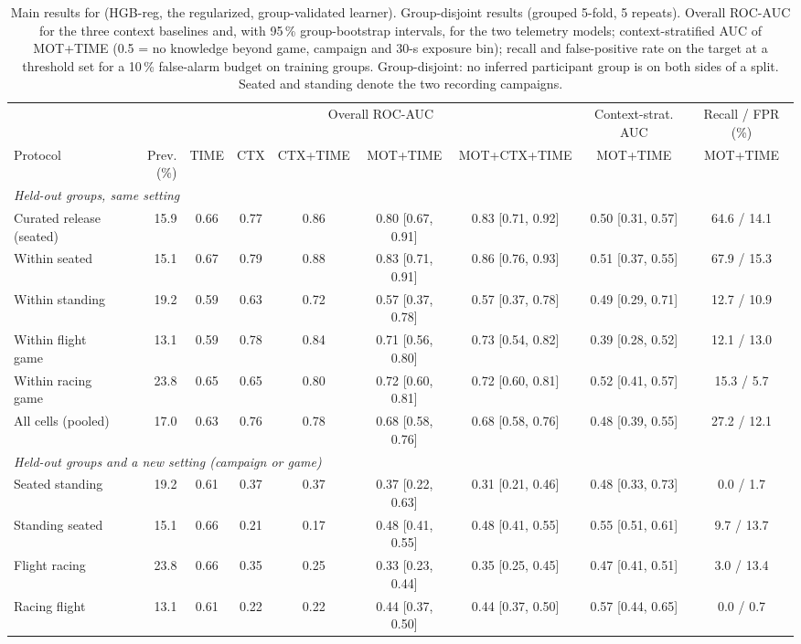 \begin{table}[t]
\centering
\footnotesize
\caption{Main results for \sevtwo{} (HGB-reg, the regularized, group-validated learner). Group-disjoint results (grouped 5-fold, 5 repeats). Overall ROC-AUC for the three context baselines and, with 95\,\% group-bootstrap intervals, for the two telemetry models; context-stratified AUC of MOT+TIME (0.5 = no knowledge beyond game, campaign and 30-s exposure bin); recall and false-positive rate on the target at a threshold set for a 10\,\% false-alarm budget on training groups. Group-disjoint: no inferred participant group is on both sides of a split. Seated and standing denote the two recording campaigns.}
\label{tab:main}
\footnotesize
\setlength{\tabcolsep}{2.4pt}
\begin{tabular}{lrccccccc}
\toprule
 & & \multicolumn{5}{c}{Overall ROC-AUC} & Context-strat. AUC & Recall / FPR (\%) \\
\cmidrule(lr){3-7}\cmidrule(lr){8-8}\cmidrule(lr){9-9}
Protocol & Prev. (\%) & TIME & CTX & CTX+TIME & MOT+TIME & MOT+CTX+TIME & MOT+TIME & MOT+TIME \\
\midrule
\multicolumn{9}{l}{\emph{Held-out groups, same setting}} \\
Curated release (seated) & 15.9 & 0.66 & 0.77 & 0.86 & 0.80 [0.67, 0.91] & 0.83 [0.71, 0.92] & 0.50 [0.31, 0.57] & 64.6 / 14.1 \\
Within seated & 15.1 & 0.67 & 0.79 & 0.88 & 0.83 [0.71, 0.91] & 0.86 [0.76, 0.93] & 0.51 [0.37, 0.55] & 67.9 / 15.3 \\
Within standing & 19.2 & 0.59 & 0.63 & 0.72 & 0.57 [0.37, 0.78] & 0.57 [0.37, 0.78] & 0.49 [0.29, 0.71] & 12.7 / 10.9 \\
Within flight game & 13.1 & 0.59 & 0.78 & 0.84 & 0.71 [0.56, 0.80] & 0.73 [0.54, 0.82] & 0.39 [0.28, 0.52] & 12.1 / 13.0 \\
Within racing game & 23.8 & 0.65 & 0.65 & 0.80 & 0.72 [0.60, 0.81] & 0.72 [0.60, 0.81] & 0.52 [0.41, 0.57] & 15.3 / 5.7 \\
All cells (pooled) & 17.0 & 0.63 & 0.76 & 0.78 & 0.68 [0.58, 0.76] & 0.68 [0.58, 0.76] & 0.48 [0.39, 0.55] & 27.2 / 12.1 \\
\multicolumn{9}{l}{\emph{Held-out groups and a new setting (campaign or game)}} \\
Seated \ra{} standing & 19.2 & 0.61 & 0.37 & 0.37 & 0.37 [0.22, 0.63] & 0.31 [0.21, 0.46] & 0.48 [0.33, 0.73] & 0.0 / 1.7 \\
Standing \ra{} seated & 15.1 & 0.66 & 0.21 & 0.17 & 0.48 [0.41, 0.55] & 0.48 [0.41, 0.55] & 0.55 [0.51, 0.61] & 9.7 / 13.7 \\
Flight \ra{} racing & 23.8 & 0.66 & 0.35 & 0.25 & 0.33 [0.23, 0.44] & 0.35 [0.25, 0.45] & 0.47 [0.41, 0.51] & 3.0 / 13.4 \\
Racing \ra{} flight & 13.1 & 0.61 & 0.22 & 0.22 & 0.44 [0.37, 0.50] & 0.44 [0.37, 0.50] & 0.57 [0.44, 0.65] & 0.0 / 0.7 \\
\bottomrule
\end{tabular}
\end{table}